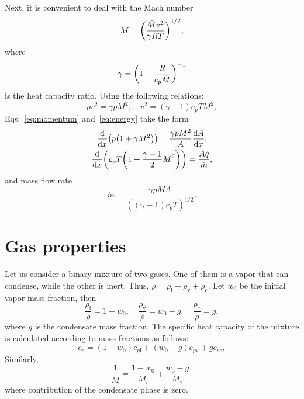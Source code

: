 \documentclass{article}
\newcommand{\vap}{\text{v}}
\newcommand{\ine}{\text{i}}
\newcommand{\con}{\text{c}}
\begin{document}
Next, it is convenient to deal with the Mach number
\begin{equation}\label{eq:Mach}
    M = \qty(\frac{\bar{M}v^2}{\gamma RT})^{1/2},
\end{equation}
where
\begin{equation}\label{eq:gamma}
    \gamma = \qty(1-\frac{R}{c_p\bar{M}})^{-1}
\end{equation}
is the heat capacity ratio.
Using the following relations:
\begin{equation*}
    \rho v^2 = \gamma p M^2, \quad v^2 = (\gamma-1)c_pT M^2,
\end{equation*}
Eqs.~\eqref{eq:momentum} and~\eqref{eq:energy} take the form
\begin{gather}
    \dv{x}(p\qty(1 + \gamma M^2)) = \frac{\gamma p M^2}{A}\dv{A}{x}, \label{eq:momentum2}\\
    \dv{x}(c_pT\qty(1 + \frac{\gamma-1}{2}M^2)) = \frac{A\dot{q}}{\dot{m}}, \label{eq:energy2}
\end{gather}
and mass flow rate
\begin{equation}\label{eq:dotm}
    \dot{m} = \frac{\gamma pMA}{((\gamma-1)c_pT)^{1/2}}.
\end{equation}

\section{Gas properties}

Let us consider a binary mixture of two gases.
One of them is a vapor that can condense, while the other is inert.
Thus, $\rho = \rho_\ine + \rho_\vap + \rho_\con$.
Let $w_0$ be the initial vapor mass fraction, then
\begin{equation}\label{eq:rhoM}
    \frac{\rho_\ine}{\rho} = 1-w_0, \quad \frac{\rho_\vap}{\rho} = w_0-g, \quad \frac{\rho_\con}{\rho} = g,
\end{equation}
where $g$ is the condensate mass fraction.
The specific heat capacity of the mixture is calculated according to mass fractions as follows:
\begin{equation}\label{eq:c_p}
    c_p = (1-w_0)c_{p\ine} + (w_0-g)c_{p\vap} + gc_{p\con},
\end{equation}
Similarly,
\begin{equation}\label{eq:M}
    \frac1{\bar{M}} = \frac{1-w_0}{M_\ine} + \frac{w_0-g}{M_\vap},
\end{equation}
where contribution of the condensate phase is zero.
\end{document}
